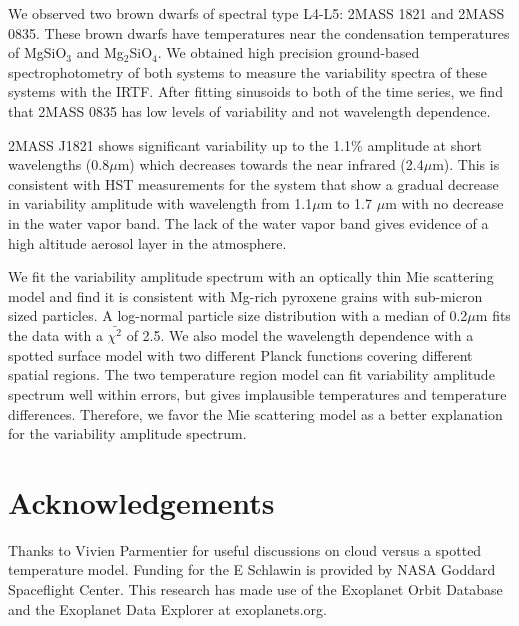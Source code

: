\documentclass[twocolumn]{aastex6}
\begin{document}
We observed two brown dwarfs of spectral type L4-L5: 2MASS 1821 and 2MASS 0835.
These brown dwarfs have temperatures near the condensation temperatures of MgSiO$_3$ and Mg$_2$SiO$_4$.
We obtained high precision ground-based spectrophotometry of both systems to measure the variability spectra of these systems with the IRTF.
After fitting sinusoids to both of the time series, we find that 2MASS 0835 has low levels of variability and not wavelength dependence.

2MASS J1821 shows significant variability up to the 1.1\% amplitude at short wavelengths (0.8$\mu$m) which decreases towards the near infrared (2.4$\mu$m).
This is consistent with HST measurements for the system that show a gradual decrease in variability amplitude with wavelength \citep{yang2016exStormsBD} from 1.1$\mu$m to 1.7 $\mu$m with no decrease in the water vapor band.
The lack of the water vapor band gives evidence of a high altitude aerosol layer in the atmosphere.

We fit the variability amplitude spectrum with an optically thin Mie scattering model and find it is consistent with Mg-rich pyroxene grains with sub-micron sized particles.
A log-normal particle size distribution with a median of 0.2$\mu$m fits the data with a $\bar{\chi^2}$ of 2.5.
We also model the wavelength dependence with a spotted surface model with two different Planck functions covering different spatial regions.
The two temperature region model can fit variability amplitude spectrum well within errors, but gives implausible temperatures and temperature differences.
Therefore, we favor the Mie scattering model as a better explanation for the variability amplitude spectrum.

\section{Acknowledgements}
Thanks to Vivien Parmentier for useful discussions on cloud versus a spotted temperature model.
Funding for the E Schlawin is provided by NASA Goddard Spaceflight Center.
This research has made use of the Exoplanet Orbit Database and the Exoplanet Data Explorer at exoplanets.org.

\end{document}
